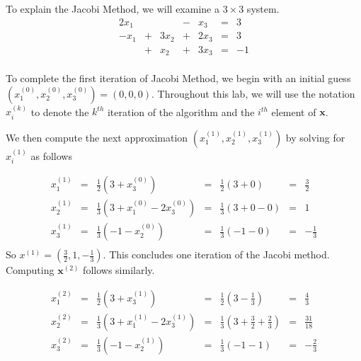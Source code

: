To explain the Jacobi Method, we will examine a $ 3 \times 3 $ system.
$$
\begin{matrix}
2x_1 &   &      & - & x_3  & = & 3 \\
-x_1 & + & 3x_2 & + & 2x_3 & = & 3 \\
     & + & x_2  & + & 3x_3 & = & -1 \\
\end{matrix}
$$

To complete the first iteration of Jacobi Method, we begin with an initial guess $(x^{(0)}_1, x^{(0)}_2, x^{(0)}_3) = (0,0,0)$. Throughout this lab, we will use the notation $x^{(k)}_i$ to denote the $k^{th}$ iteration of the algorithm and the $i^{th}$ element of $\mathbf{x}$.

We then compute the next approximation $(x^{(1)}_1, x^{(1)}_2, x^{(1)}_3)$ by solving for $x^{(1)}_i$ as follows

$$
\begin{matrix}
x^{(1)}_1 & = & \frac{1}{2} ( 3 + x^{(0)}_3)  & = & \frac{1}{2} (3 + 0)     & = & \frac{3}{2} \\
x^{(1)}_2 & = & \frac{1}{3} ( 3 + x^{(0)}_1 - 2x^{(0)}_3) & = & \frac{1}{3} (3 + 0 - 0) & = & 1 \\
x^{(1)}_3 & = & \frac{1}{3} ( -1 - x^{(0)}_2)       & = & \frac{1}{3} (-1 - 0)    & = & -\frac{1}{3} \\
\end{matrix}
$$
So $x^{(1)} = (\frac{3}{2}, 1, -\frac{1}{3})$. This concludes one iteration of the Jacobi method. Computing $\mathbf{x}^{(2)}$ follows similarly.

$$
\begin{matrix}
x^{(2)}_1 & = & \frac{1}{2} ( 3 + x^{(1)}_3)  & = & \frac{1}{2} (3 - \frac{1}{3})     & = & \frac{4}{3} \\
x^{(2)}_2 & = & \frac{1}{3} ( 3 + x^{(1)}_1 - 2x^{(1)}_3) & = & \frac{1}{3} (3 + \frac{3}{2} + \frac{2}{3}) & = &  \frac{31}{18} \\
x^{(2)}_3 & = & \frac{1}{3} ( -1 - x^{(1)}_2)       & = & \frac{1}{3} (-1 - 1)    & = & -\frac{2}{3} \\
\end{matrix}
$$


